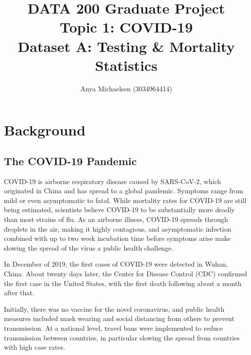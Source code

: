\documentclass[11pt]{article}
\title{DATA 200 Graduate Project\\ {\Large Topic 1: COVID-19}\\
{\large Dataset A: Testing \& Mortality Statistics}}
\author{ Anya Michaelsen (3034964414) }
\date{}
\begin{document}
\maketitle	

{ \hypersetup{hidelinks} \tableofcontents }%


%
%
%
%
%

\pagebreak
\section{Background}


\subsection{The COVID-19 Pandemic}

COVID-19 is airborne respiratory disease caused by SARS-CoV-2, which originated in China and has spread to a global pandemic. Symptoms range from mild or even asymptomatic to fatal. While mortality rates for COVID-19 are still being estimated, scientists believe COVID-19 to be substantially more deadly than most strains of flu.%
 As an airborne illness, COVID-19 spreads through droplets in the air, making it highly contagious, and asymptomatic infection combined with up to two week incubation time before symptoms arise make slowing the spread of the virus a public health challenge. 
 
 In December of 2019, the first cases of COVID-19 were detected in Wuhan, China. About twenty days later, the Center for Disease Control (CDC) confirmed the first case in the United States, with the first death following about a month after that. 
 
 Initially, there was no vaccine for the novel coronavirus, and public health measures included mask wearing and social distancing from others to prevent transmission. At a national level, travel bans were implemented to reduce transmission between countries, in particular slowing the spread from countries with high case rates. 
 
\end{document}
